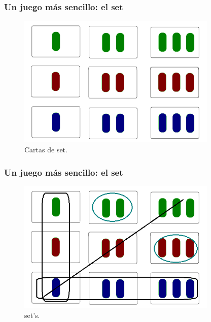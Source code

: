 \documentclass[smaller,usepdftitle=false]{beamer}
\newcommand\set{\textsf{set}}
\begin{document}
\begin{frame}
\frametitle{Un juego más sencillo: el \set}

\begin{figure}[h!]
\centering
\includegraphics[width=0.85\textwidth]{ov-rojo}
\caption{Cartas de \set.}
\end{figure}
\end{frame}

\begin{frame}
\frametitle{Un juego más sencillo: el \set}

\begin{figure}[h!]
\centering
\includegraphics[width=0.85\textwidth]{ov-rojo-s}
\caption{\set's.}
\end{figure}
\end{frame}
\end{document}
